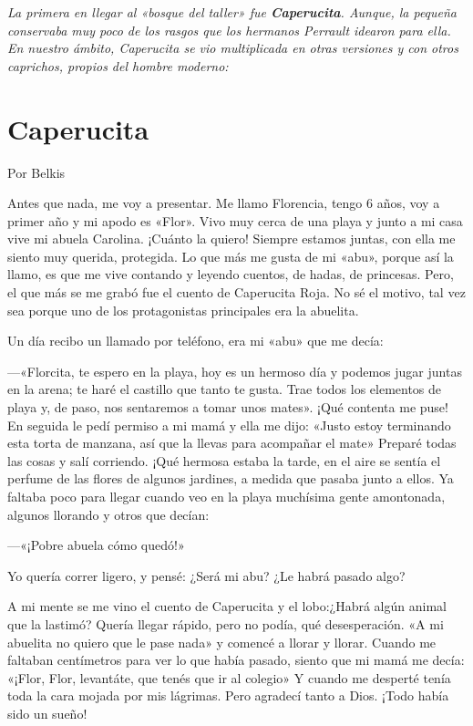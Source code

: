 \documentclass[11pt,twoside,openright,a5paper]{book}
\begin{document}
\emph{La primera en llegar al «bosque del taller» fue \textbf{Caperucita}. Aunque, la pequeña conservaba muy poco de los rasgos que los hermanos Perrault idearon para ella. En nuestro ámbito, Caperucita se vio multiplicada en otras versiones y con otros caprichos, propios del hombre moderno:}

\section*{Caperucita}

\begin{flushright}\begin{flushright}Por Belkis\end{flushright}\end{flushright}

Antes que nada, me voy a presentar. Me llamo Florencia, tengo 6 años, voy a primer año y mi apodo es «Flor». Vivo muy cerca de una playa y junto a mi casa vive mi abuela Carolina. ¡Cuánto la quiero! Siempre estamos juntas, con ella me siento muy querida, protegida. Lo que más me gusta de mi «abu», porque así la llamo, es que me vive contando y leyendo cuentos, de hadas, de princesas. Pero, el que más se me grabó fue el cuento de Caperucita Roja. No sé el motivo, tal vez sea porque uno de los protagonistas principales era la abuelita.

Un día recibo un llamado por teléfono, era mi «abu» que me decía: 

---«Florcita, te espero en la playa, hoy es un hermoso día y podemos jugar juntas en la arena; te haré el castillo que tanto te gusta. Trae todos los elementos de playa y, de paso, nos sentaremos a tomar unos mates». ¡Qué contenta me puse! En seguida le pedí permiso a mi mamá y ella me dijo: «Justo estoy terminando esta torta de manzana, así que la llevas para acompañar el mate»
Preparé todas las cosas y salí corriendo. ¡Qué hermosa estaba la tarde, en el aire se sentía el perfume de las flores de algunos jardines, a medida que pasaba junto a ellos. Ya faltaba poco para llegar cuando veo en la playa muchísima gente amontonada, algunos llorando y otros que decían: 

---«¡Pobre abuela cómo quedó!»

Yo quería correr ligero, y pensé: ¿Será mi abu? ¿Le habrá pasado algo?

A mi mente se me vino el cuento de Caperucita y el lobo:¿Habrá algún animal que la lastimó? Quería llegar rápido, pero no podía, qué desesperación. «A mi abuelita no quiero que le pase nada» y comencé a llorar y llorar. Cuando me faltaban centímetros para ver lo que había pasado, siento que mi mamá me decía: «¡Flor, Flor, levantáte, que tenés que ir al colegio» 
Y cuando me desperté tenía toda la cara mojada por mis lágrimas. Pero agradecí tanto a Dios. ¡Todo había sido un sueño! 
\end{document}
